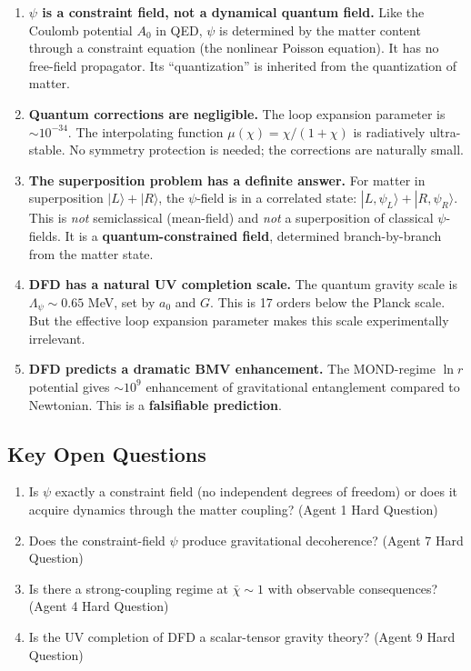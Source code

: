 \documentclass[11pt,a4paper]{article}
\begin{document}
\begin{enumerate}
\item \textbf{$\psi$ is a constraint field, not a dynamical quantum field.} Like the Coulomb potential $A_0$ in QED, $\psi$ is determined by the matter content through a constraint equation (the nonlinear Poisson equation). It has no free-field propagator. Its ``quantization'' is inherited from the quantization of matter.

\item \textbf{Quantum corrections are negligible.} The loop expansion parameter is $\sim 10^{-34}$. The interpolating function $\mu(\chi) = \chi/(1+\chi)$ is radiatively ultra-stable. No symmetry protection is needed; the corrections are naturally small.

\item \textbf{The superposition problem has a definite answer.} For matter in superposition $|L\rangle + |R\rangle$, the $\psi$-field is in a correlated state: $|L,\psi_L\rangle + |R,\psi_R\rangle$. This is \emph{not} semiclassical (mean-field) and \emph{not} a superposition of classical $\psi$-fields. It is a \textbf{quantum-constrained field}, determined branch-by-branch from the matter state.

\item \textbf{DFD has a natural UV completion scale.} The quantum gravity scale is $\Lambda_\psi \sim 0.65$ MeV, set by $a_0$ and $G$. This is 17 orders below the Planck scale. But the effective loop expansion parameter makes this scale experimentally irrelevant.

\item \textbf{DFD predicts a dramatic BMV enhancement.} The MOND-regime $\ln r$ potential gives $\sim 10^9$ enhancement of gravitational entanglement compared to Newtonian. This is a \textbf{falsifiable prediction}.
\end{enumerate}

\subsection{Key Open Questions}

\begin{enumerate}
\item Is $\psi$ exactly a constraint field (no independent degrees of freedom) or does it acquire dynamics through the matter coupling? (Agent 1 Hard Question)
\item Does the constraint-field $\psi$ produce gravitational decoherence? (Agent 7 Hard Question)
\item Is there a strong-coupling regime at $\bar\chi \sim 1$ with observable consequences? (Agent 4 Hard Question)
\item Is the UV completion of DFD a scalar-tensor gravity theory? (Agent 9 Hard Question)
\end{enumerate}
\end{document}

